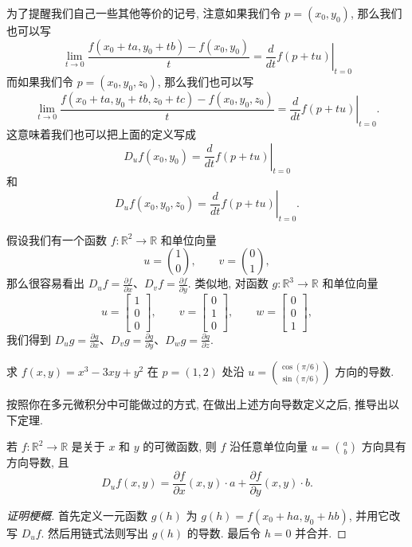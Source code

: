 为了提醒我们自己一些其他等价的记号, 注意如果我们令 $p=(x_0,y_0)$, 那么我们也可以写
\[
\lim_{t\to0}\frac{f(x_0+ta,y_0+tb)-f(x_0,y_0)}{t}
=\left.\frac{d}{dt}f(p+tu)\right|_{t=0}
\]
而如果我们令 $p=(x_0,y_0,z_0)$, 那么我们也可以写
\[
\lim_{t\to0}\frac{f(x_0+ta,y_0+tb,z_0+tc)-f(x_0,y_0,z_0)}{t}
=\left.\frac{d}{dt}f(p+tu)\right|_{t=0}.
\]
这意味着我们也可以把上面的定义写成
\[
D_uf(x_0,y_0)=\left.\frac{d}{dt}f(p+tu)\right|_{t=0}
\]
和
\[
D_uf(x_0,y_0,z_0)=\left.\frac{d}{dt}f(p+tu)\right|_{t=0}.
\]

假设我们有一个函数 $f:\mathbb{R}^2\to\mathbb{R}$ 和单位向量
\[
u=\binom{1}{0},\qquad v=\binom{0}{1},
\]
那么很容易看出 $D_uf=\frac{\partial f}{\partial x}$、$D_vf=\frac{\partial f}{\partial y}$. 类似地, 对函数 $g:\mathbb{R}^3\to\mathbb{R}$ 和单位向量
\[
u=\begin{bmatrix}1\\0\\0\end{bmatrix},\qquad v=\begin{bmatrix}0\\1\\0\end{bmatrix},\qquad w=\begin{bmatrix}0\\0\\1\end{bmatrix},
\]
我们得到 $D_ug=\frac{\partial g}{\partial x}$、$D_vg=\frac{\partial g}{\partial y}$、$D_wg=\frac{\partial g}{\partial z}$.

\begin{question}\label{q:2-2}
求 $f(x,y)=x^3-3xy+y^2$ 在 $p=(1,2)$ 处沿 $u=\binom{\cos(\pi/6)}{\sin(\pi/6)}$ 方向的导数.
\end{question}

按照你在多元微积分中可能做过的方式, 在做出上述方向导数定义之后, 推导出以下定理.

\begin{theorem}[方向导数的计算公式]\label{thm:2-1}
若 $f:\mathbb{R}^2\to\mathbb{R}$ 是关于 $x$ 和 $y$ 的可微函数, 则 $f$ 沿任意单位向量 $u=\binom{a}{b}$ 方向具有方向导数, 且
\[
D_uf(x,y)=\frac{\partial f}{\partial x}(x,y)\cdot a+\frac{\partial f}{\partial y}(x,y)\cdot b.
\]
\end{theorem}

\begin{proof}[证明梗概]
首先定义一元函数 $g(h)$ 为 $g(h)=f(x_0+ha,y_0+hb)$, 并用它改写 $D_uf$. 然后用链式法则写出 $g(h)$ 的导数. 最后令 $h=0$ 并合并.
\end{proof}

